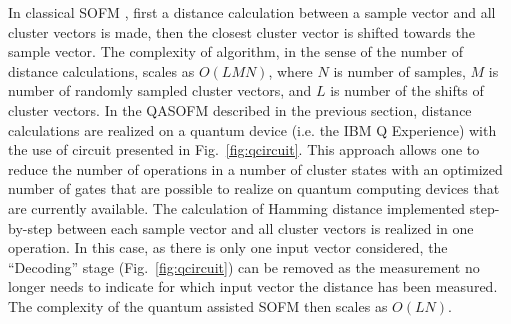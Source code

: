 \documentclass[pra,showkeys,twocolumn,showpacs,aps,10pt]{revtex4-1}
\begin{document}
In classical SOFM \cite{kohonen1990}, first a distance calculation between a sample vector and all cluster vectors is made,
then the closest cluster vector is shifted towards the sample vector.
The complexity of algorithm, in the sense of the number of distance calculations, scales as $O(LMN)$,
where $N$ is number of samples,
$M$ is number of randomly sampled cluster vectors,
and $L$ is number of the shifts of cluster vectors.
In the QASOFM described in the previous section, distance calculations are realized on a quantum device (i.e. the IBM Q Experience) with the use of circuit presented in Fig.~\ref{fig:qcircuit}. This approach allows one to reduce the number of operations in a number of cluster states with an optimized number of gates
that are possible to realize on  quantum computing devices that are currently available.
The calculation of Hamming distance implemented step-by-step between each sample vector and all cluster vectors is realized in one operation. In this case, as there is only one input vector considered, the ``Decoding'' stage (Fig.~\ref{fig:qcircuit}) can be removed as the measurement no longer needs to indicate for which input vector the distance has been measured.
The complexity of the quantum assisted SOFM then scales as $O(LN)$.
\end{document}
